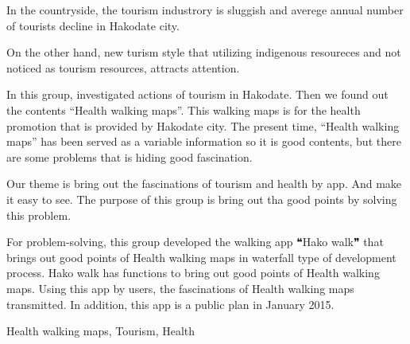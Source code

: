 ﻿\begin{eabstract}

 In the countryside, the tourism industrory is sluggish and
 averege annual number of tourists decline in Hakodate city.

 On the other hand, new turism style that utilizing indigenous resoureces and not noticed as tourism resources, attracts attention.

 In this group, investigated actions of tourism in Hakodate. Then we found out the contents “Health walking maps”. This walking maps is for the health promotion that is provided by Hakodate city. The present time, “Health walking maps” has been served as a variable information so it is good contents, but there are some problems that is hiding good fascination.

 Our theme is bring out the fascinations of tourism and health by app. And make it easy to see. The purpose of this group is bring out tha good points by solving this problem.

 For problem-solving, this group developed the walking app ❝Hako walk❞ that brings out good points of Health walking maps in waterfall type of development process. Hako walk has functions to bring out good points of Health walking maps. Using this app by users, the fascinations of Health walking maps transmitted. In addition, this app is a public plan in January 2015.


\begin{ekeyword}
Health walking maps, Tourism, Health
\end{ekeyword}
\end{eabstract}
